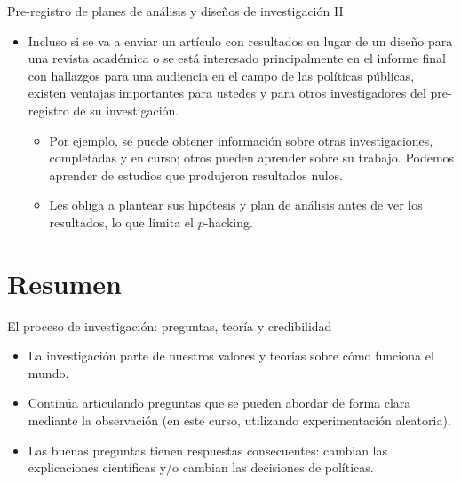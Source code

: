 \documentclass[
  ignorenonframetext,
]{beamer}
\begin{document}
\begin{frame}{Pre-registro de planes de análisis y diseños de
investigación II}
\protect\hypertarget{pre-registro-de-planes-de-anuxe1lisis-y-diseuxf1os-de-investigaciuxf3n-ii}{}
\begin{itemize}
\item
  Incluso si se va a enviar un artículo con resultados en lugar de un
  diseño para una revista académica o se está interesado principalmente
  en el informe final con hallazgos para una audiencia en el campo de
  las políticas públicas, existen ventajas importantes para ustedes y
  para otros investigadores del pre-registro de su investigación.

  \begin{itemize}
  \item
    Por ejemplo, se puede obtener información sobre otras
    investigaciones, completadas y en curso; otros pueden aprender sobre
    su trabajo. Podemos aprender de estudios que produjeron resultados
    nulos.
  \item
    Les obliga a plantear sus hipótesis y plan de análisis antes de ver
    los resultados, lo que limita el \(p\)-hacking.
  \end{itemize}
\end{itemize}
\end{frame}

\hypertarget{resumen}{%
\section{Resumen}\label{resumen}}

\begin{frame}{El proceso de investigación: preguntas, teoría y
credibilidad}
\protect\hypertarget{el-proceso-de-investigaciuxf3n-preguntas-teoruxeda-y-credibilidad}{}
\begin{itemize}
\item
  La investigación parte de nuestros valores y teorías sobre cómo
  funciona el mundo.
\item
  Continúa articulando preguntas que se pueden abordar de forma clara
  mediante la observación (en este curso, utilizando experimentación
  aleatoria).
\item
  Las buenas preguntas tienen respuestas consecuentes: cambian las
  explicaciones científicas y/o cambian las decisiones de políticas.
\end{itemize}
\end{frame}
\end{document}
